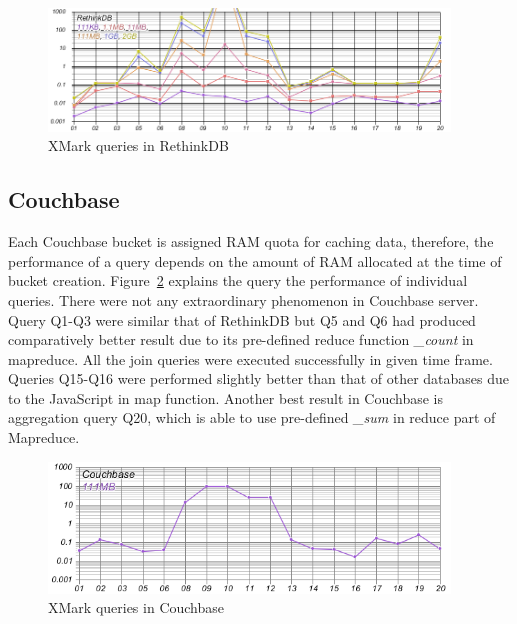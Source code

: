 \begin{figure}
	\centering
	\includegraphics[width=0.95\textwidth]{img/result/rethinkdb/rethinkdb-all}
	\caption{XMark queries in RethinkDB}
	\label{fig:xmark-result-rethinkdb-all}
\end{figure}

\subsection{Couchbase}
Each Couchbase bucket is assigned RAM quota for caching data, therefore, the performance of a query depends on the amount of RAM allocated at the time of bucket creation. Figure~\ref{fig:xmark-result-cb-all} explains the query the performance of individual queries. There were not any extraordinary phenomenon in Couchbase server.  Query Q1-Q3  were similar that of RethinkDB but Q5 and Q6 had produced comparatively better result due to its pre-defined reduce function \textit{\_count} in mapreduce. All the join queries were executed successfully in given time frame. Queries Q15-Q16 were performed slightly  better than that of other databases due to the JavaScript in map function. Another best result in Couchbase is aggregation query Q20, which is able to use pre-defined \textit{\_sum} in reduce part of Mapreduce. 

\begin{figure}
	\centering
	\includegraphics[width=0.95\textwidth]{img/result/cb/cb-all}
	\caption{XMark queries in Couchbase}
	\label{fig:xmark-result-cb-all}
\end{figure}

